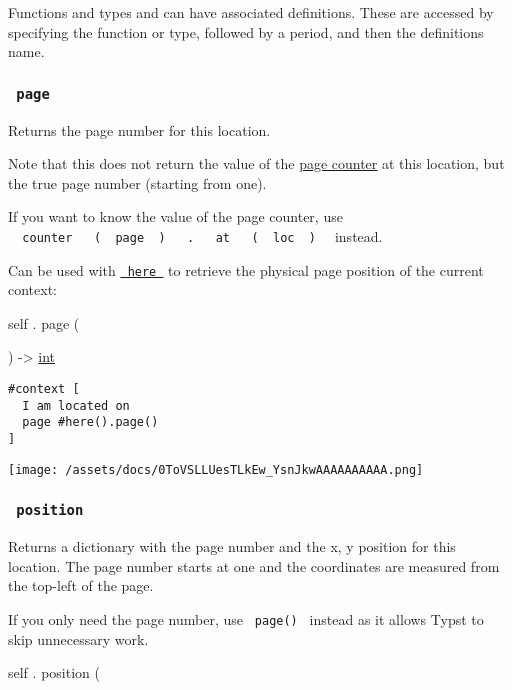 \label{definitions-tooltip}
Functions and types and can have associated definitions. These are
accessed by specifying the function or type, followed by a period, and
then the definition\textquotesingle s name.

\subsubsection{\texorpdfstring{\texttt{\ page\ }}{ page }}\label{definitions-page}

Returns the page number for this location.

Note that this does not return the value of the
\href{/docs/reference/introspection/counter/}{page counter} at this
location, but the true page number (starting from one).

If you want to know the value of the page counter, use
\texttt{\ }{\texttt{\ counter\ }}\texttt{\ }{\texttt{\ (\ }}\texttt{\ page\ }{\texttt{\ )\ }}\texttt{\ }{\texttt{\ .\ }}\texttt{\ }{\texttt{\ at\ }}\texttt{\ }{\texttt{\ (\ }}\texttt{\ loc\ }{\texttt{\ )\ }}\texttt{\ }
instead.

Can be used with
\href{/docs/reference/introspection/here/}{\texttt{\ here\ }} to
retrieve the physical page position of the current context:

self { . } { page } (

) -\textgreater{} \href{/docs/reference/foundations/int/}{int}

\begin{verbatim}
#context [
  I am located on
  page #here().page()
]
\end{verbatim}

\texttt{[image: /assets/docs/0ToVSLLUesTLkEw\_YsnJkwAAAAAAAAAA.png]}

\subsubsection{\texorpdfstring{\texttt{\ position\ }}{ position }}\label{definitions-position}

Returns a dictionary with the page number and the x, y position for this
location. The page number starts at one and the coordinates are measured
from the top-left of the page.

If you only need the page number, use \texttt{\ page()\ } instead as it
allows Typst to skip unnecessary work.

self { . } { position } (

